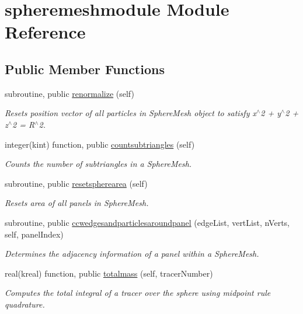 \hypertarget{classspheremeshmodule}{\section{spheremeshmodule Module Reference}
\label{classspheremeshmodule}
}
\subsection*{Public Member Functions}
\begin{DoxyCompactItemize}
\item 
subroutine, public \hyperlink{group__SphereMesh_ga7e822ca8c1c2f3dbb84c1677b73b01d8}{renormalize} (self)
\begin{DoxyCompactList}\small\item\em Resets position vector of all particles in Sphere\+Mesh object to satisfy x$^\wedge$2 + y$^\wedge$2 + z$^\wedge$2 = R$^\wedge$2. \end{DoxyCompactList}\item 
integer(kint) function, public \hyperlink{group__SphereMesh_ga7e2d1d284ff59b890c4e2cbe2bc7106c}{countsubtriangles} (self)
\begin{DoxyCompactList}\small\item\em Counts the number of subtriangles in a Sphere\+Mesh. \end{DoxyCompactList}\item 
subroutine, public \hyperlink{group__SphereMesh_ga8a8a47063a070aa34913a6ecffd90e62}{resetspherearea} (self)
\begin{DoxyCompactList}\small\item\em Resets area of all panels in Sphere\+Mesh. \end{DoxyCompactList}\item 
subroutine, public \hyperlink{group__SphereMesh_ga05c2ef27a6cef4f07bacbeae15d7a290}{ccwedgesandparticlesaroundpanel} (edge\+List, vert\+List, n\+Verts, self, panel\+Index)
\begin{DoxyCompactList}\small\item\em Determines the adjacency information of a panel within a Sphere\+Mesh. \end{DoxyCompactList}\item 
real(kreal) function, public \hyperlink{group__SphereMesh_gaff88fd47f20601b9ce1fc3b80f66c180}{totalmass} (self, tracer\+Number)
\begin{DoxyCompactList}\small\item\em Computes the total integral of a tracer over the sphere using midpoint rule quadrature. \end{DoxyCompactList}\item 

\end{DoxyCompactItemize}
